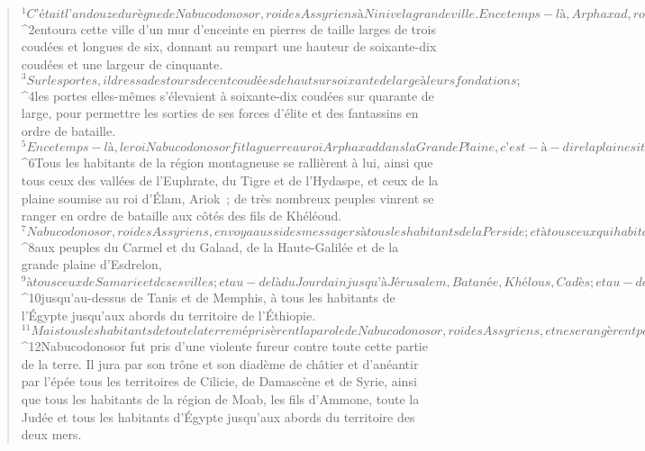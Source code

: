   
  
    
      
         
      \bchapter{}
      \begin{verse}
${}^{1}C’était l’an douze du règne de Nabucodonosor, roi des Assyriens à Ninive la grande ville. En ce temps-là, Arphaxad, roi des Mèdes à Ecbatane, 
${}^{2}entoura cette ville d’un mur d’enceinte en pierres de taille larges de trois coudées et longues de six, donnant au rempart une hauteur de soixante-dix coudées et une largeur de cinquante. 
${}^{3}Sur les portes, il dressa des tours de cent coudées de haut sur soixante de large à leurs fondations ; 
${}^{4}les portes elles-mêmes s’élevaient à soixante-dix coudées sur quarante de large, pour permettre les sorties de ses forces d’élite et des fantassins en ordre de bataille.
${}^{5}En ce temps-là, le roi Nabucodonosor fit la guerre au roi Arphaxad dans la Grande Plaine, c’est-à-dire la plaine située sur le territoire de Ragau. 
${}^{6}Tous les habitants de la région montagneuse se rallièrent à lui, ainsi que tous ceux des vallées de l’Euphrate, du Tigre et de l’Hydaspe, et ceux de la plaine soumise au roi d’Élam, Ariok ; de très nombreux peuples vinrent se ranger en ordre de bataille aux côtés des fils de Khéléoud. 
${}^{7}Nabucodonosor, roi des Assyriens, envoya aussi des messagers à tous les habitants de la Perside ; et à tous ceux qui habitaient vers l’ouest, aux habitants de Cilicie, de Damascène, du Liban et de l’Anti-Liban ; et à tous les habitants du littoral, 
${}^{8}aux peuples du Carmel et du Galaad, de la Haute-Galilée et de la grande plaine d’Esdrelon, 
${}^{9}à tous ceux de Samarie et de ses villes ; et au-delà du Jourdain jusqu’à Jérusalem, Batanée, Khélous, Cadès ; et au-delà du Torrent d’Égypte, jusqu’à Taphnès et Ramessès, tout le territoire de Guesèm, 
${}^{10}jusqu’au-dessus de Tanis et de Memphis, à tous les habitants de l’Égypte jusqu’aux abords du territoire de l’Éthiopie.
${}^{11}Mais tous les habitants de toute la terre méprisèrent la parole de Nabucodonosor, roi des Assyriens, et ne se rangèrent pas à ses côtés pour combattre, car ils ne le craignaient pas, ils le considéraient comme un homme isolé. Ils renvoyèrent donc ses messagers les mains vides, et sans honneurs. 
${}^{12}Nabucodonosor fut pris d’une violente fureur contre toute cette partie de la terre. Il jura par son trône et son diadème de châtier et d’anéantir par l’épée tous les territoires de Cilicie, de Damascène et de Syrie, ainsi que tous les habitants de la région de Moab, les fils d’Ammone, toute la Judée et tous les habitants d’Égypte jusqu’aux abords du territoire des deux mers.

\end{verse}
